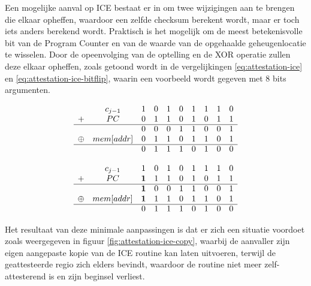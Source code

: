 Een mogelijke aanval op ICE bestaat er in om twee wijzigingen aan te brengen
die elkaar opheffen, waardoor een zelfde checksum berekent wordt, maar er toch
iets anders berekend wordt. Praktisch is het mogelijk om de meest
betekenisvolle bit van de Program Counter en van de waarde van de opgehaalde
geheugenlocatie te wisselen. Door de opeenvolging van de optelling en de XOR
operatie zullen deze elkaar opheffen, zoals getoond wordt in de vergelijkingen
\ref{eq:attestation-ice} en \ref{eq:attestation-ice-bitflip}, waarin een
voorbeeld wordt gegeven met 8 bits argumenten.

\begin{equation} \label{eq:attestation-ice}
\begin{array}{cccccccccc}
       & c_{j-1}    & 1 &	0 &	1 &	0 &	1 &	1 &	1 &	0 \\
+	     & PC	        & 0	& 1	& 1	& 0	& 1	& 0	& 1	& 1 \\
\cline{1-10}
       &            &	0	& 0	& 0	& 1	& 1	& 0	& 0	& 1 \\
\oplus &	mem[addr]	& 0	& 1	& 1 &	0	& 1	& 1	& 0	& 1 \\
\cline{1-10}
       &            &	0	& 1	& 1	& 1	& 0	& 1	& 0	& 0 \\
\end{array}
\end{equation}

\begin{equation} \label{eq:attestation-ice-bitflip}
\begin{array}{cccccccccc}
       & c_{j-1}    & 1 &	0 &	1 &	0 &	1 &	1 &	1 &	0 \\
+	     & PC	        & \bm{1}	& 1	& 1	& 0	& 1	& 0	& 1	& 1 \\
\cline{1-10}
       &            &	\bm{1}	& 0	& 0	& 1	& 1	& 0	& 0	& 1 \\
\oplus &	mem[addr]	& \bm{1}	& 1	& 1 &	0	& 1	& 1	& 0	& 1 \\
\cline{1-10}
       &            &	0	& 1	& 1	& 1	& 0	& 1	& 0	& 0 \\
\end{array}
\end{equation}

Het resultaat van deze minimale aanpassingen is dat er zich een situatie
voordoet zoals weergegeven in figuur \ref{fig:attestation-ice-copy}, waarbij de
aanvaller zijn eigen aangepaste kopie van de ICE routine kan laten uitvoeren,
terwijl de geattesteerde regio zich elders bevindt, waardoor de routine niet
meer zelf-attesterend is en zijn beginsel verliest.

